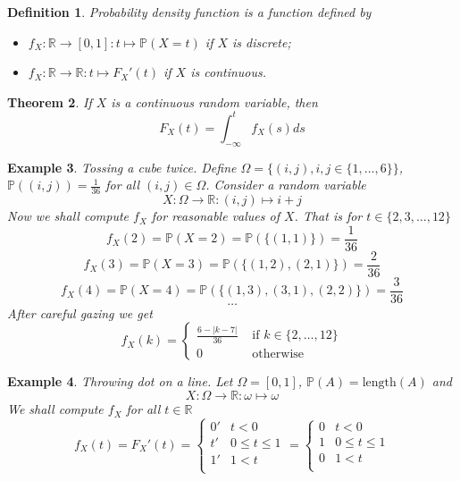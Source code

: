 \documentclass[12pt]{article}
\newtheorem{theorem}{Theorem}[subsection]
\newtheorem{definition}[theorem]{Definition}
\newtheorem{example}[theorem]{Example}
\begin{document}
\begin{definition} Probability density function is a function defined by
    \begin{itemize}
        \item $f_X:\mathbb{R}\to [0,1]: t\mapsto \mathbb{P}(X=t)$ if $X$ is
              discrete;
        \item $f_X:\mathbb{R}\to\mathbb{R}: t\mapsto  F_X'(t) $ if $X$ is
              continuous.
    \end{itemize}
\end{definition}

\begin{theorem} If $X$ is a continuous random variable, then
    $$
        F_X(t)=\int_{-\infty}^t f_X(s)ds
    $$
\end{theorem}

\begin{example} Tossing a cube twice. Define
    $\Omega=\{(i,j), i,j\in \{1,\ldots,6\} \}$,
    $\mathbb{P}((i,j))=\frac{1}{36}$ for all
    $(i,j)\in \Omega$. Consider a random variable
    $$
        X:\Omega\to\mathbb{R}:(i,j)\mapsto i+j
    $$
    Now we shall compute $f_X$ for reasonable values of $X$. That is for
    $t\in \{2,3,\ldots,12\}$
    $$
        f_X(2)=\mathbb{P}(X=2)=\mathbb{P}(\{(1,1)\})=\frac{1}{36}
    $$
    $$
        f_X(3)=\mathbb{P}(X=3)=\mathbb{P}(\{(1,2),(2,1)\})=\frac{2}{36}
    $$
    $$
        f_X(4)=\mathbb{P}(X=4)=\mathbb{P}(\{(1,3),(3,1),(2,2)\})=\frac{3}{36}
    $$
    $$
        \ldots
    $$
    After careful gazing we get
    $$
        f_X(k)=
        \begin{cases}
            \frac{6-|k-7|}{36} & \mbox{ if } k\in \{2,\ldots,12\} \\
            0                  & \mbox{ otherwise }
        \end{cases}
    $$
\end{example}

\begin{example} Throwing dot on a line. Let $\Omega=[0,1]$,
    $\mathbb{P}(A)=\mbox{length}(A)$ and
    $$
        X:\Omega\to\mathbb{R}:\omega\mapsto \omega
    $$
    We shall compute $f_X$ for all $t\in\mathbb{R}$
    $$
        f_X(t)=F_X'(t)
        =\begin{cases}
            0' & t < 0          \\
            t' & 0\leq t \leq 1 \\
            1' & 1 < t          \\
        \end{cases}
        =\begin{cases}
            0 & t < 0          \\
            1 & 0\leq t \leq 1 \\
            0 & 1 < t          \\
        \end{cases}
    $$
\end{example}
\end{document}
